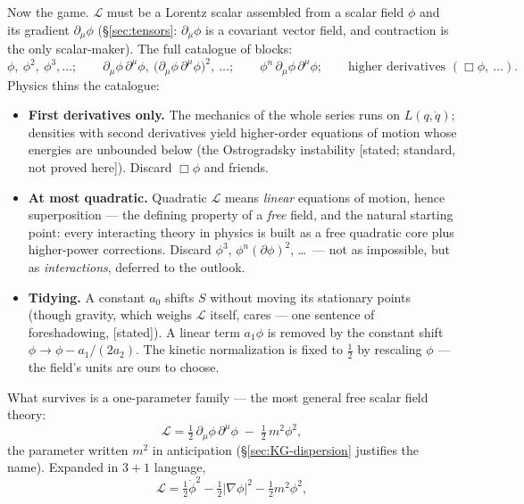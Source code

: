 \documentclass[11pt]{article}
\theoremstyle{plain}
\theoremstyle{definition}
\theoremstyle{remark}
\begin{document}
Now the game. $\mathcal L$ must be a Lorentz scalar assembled from a
scalar field $\phi$ and its gradient $\partial_\mu\phi$
(\S\ref{sec:tensors}: $\partial_\mu\phi$ is a covariant vector field,
and contraction is the only scalar-maker). The full catalogue of
blocks:
\begin{equation}
  \phi,\ \phi^2,\ \phi^3, \dots;
  \qquad
  \partial_\mu\phi\,\partial^\mu\phi,\ 
  \bigl(\partial_\mu\phi\,\partial^\mu\phi\bigr)^2,\ \dots;
  \qquad
  \phi^n\,\partial_\mu\phi\,\partial^\mu\phi;
  \qquad
  \text{higher derivatives } (\Box\phi,\ \dots).
\end{equation}
Physics thins the catalogue:
\begin{itemize}
  \item \textbf{First derivatives only.} The mechanics of the whole
  series runs on $L(q, \dot q)$; densities with second derivatives
  yield higher-order equations of motion whose energies are unbounded
  below (the Ostrogradsky instability [stated; standard, not proved
  here]). Discard $\Box\phi$ and friends.
  \item \textbf{At most quadratic.} Quadratic $\mathcal L$ means
  \emph{linear} equations of motion, hence superposition --- the
  defining property of a \emph{free} field, and the natural starting
  point: every interacting theory in physics is built as a free
  quadratic core plus higher-power corrections. Discard $\phi^3$,
  $\phi^n(\partial\phi)^2$, \dots\ --- not as impossible, but as
  \emph{interactions}, deferred to the outlook.
  \item \textbf{Tidying.} A constant $a_0$ shifts $S$ without moving
  its stationary points (though gravity, which weighs $\mathcal L$
  itself, cares --- one sentence of foreshadowing, [stated]). A linear
  term $a_1\phi$ is removed by the constant shift
  $\phi \to \phi - a_1/(2a_2)$. The kinetic normalization is fixed to
  $\tfrac12$ by rescaling $\phi$ --- the field's units are ours to
  choose.
\end{itemize}
What survives is a one-parameter family --- the most general free
scalar field theory:
\begin{equation}
  \boxed{\;
  \mathcal L
  = \tfrac12\,\partial_\mu\phi\,\partial^\mu\phi
  \;-\; \tfrac12\, m^2 \phi^2 ,
  \;}
  \label{eq:KG-lagrangian}
\end{equation}
the parameter written $m^2$ in anticipation
(\S\ref{sec:KG-dispersion} justifies the name). Expanded in $3{+}1$
language,
\begin{equation}
  \mathcal L
  = \tfrac12\dot\phi^2
  - \tfrac12|\nabla\phi|^2
  - \tfrac12 m^2\phi^2 ,
  \label{eq:KG-31}
\end{equation}
\end{document}
